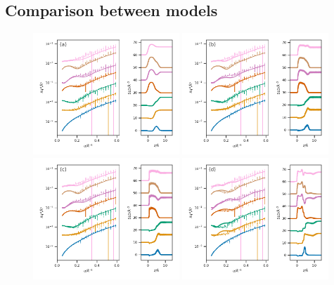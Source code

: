 \documentclass[twoside,twocolumn,9pt]{article}
\begin{document}
\subsection{Comparison between models}
%
\begin{figure}
 \centering
 \includegraphics[width=0.49\textwidth]{figures/trad_30}
 \includegraphics[width=0.49\textwidth]{figures/sim_slipids_30} \\
 \includegraphics[width=0.49\textwidth]{figures/sim_berger_30}
 \includegraphics[width=0.49\textwidth]{figures/sim_martini_30}

\end{figure}
\end{document}
